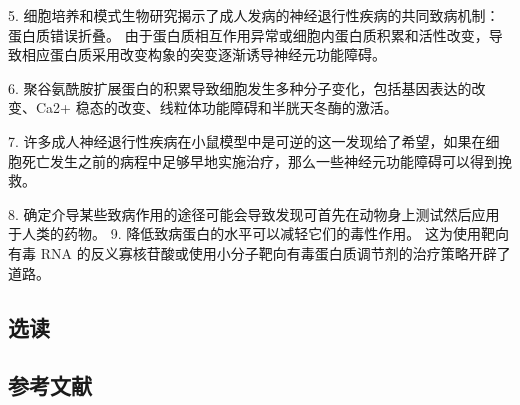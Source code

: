 5. 细胞培养和模式生物研究揭示了成人发病的神经退行性疾病的共同致病机制：蛋白质错误折叠。 由于蛋白质相互作用异常或细胞内蛋白质积累和活性改变，导致相应蛋白质采用改变构象的突变逐渐诱导神经元功能障碍。 

6. 聚谷氨酰胺扩展蛋白的积累导致细胞发生多种分子变化，包括基因表达的改变、Ca2+ 稳态的改变、线粒体功能障碍和半胱天冬酶的激活。 

7. 许多成人神经退行性疾病在小鼠模型中是可逆的这一发现给了希望，如果在细胞死亡发生之前的病程中足够早地实施治疗，那么一些神经元功能障碍可以得到挽救。 

8. 确定介导某些致病作用的途径可能会导致发现可首先在动物身上测试然后应用于人类的药物。 9. 降低致病蛋白的水平可以减轻它们的毒性作用。 这为使用靶向有毒 RNA 的反义寡核苷酸或使用小分子靶向有毒蛋白质调节剂的治疗策略开辟了道路。

\subsection{选读}
\subsection{参考文献}